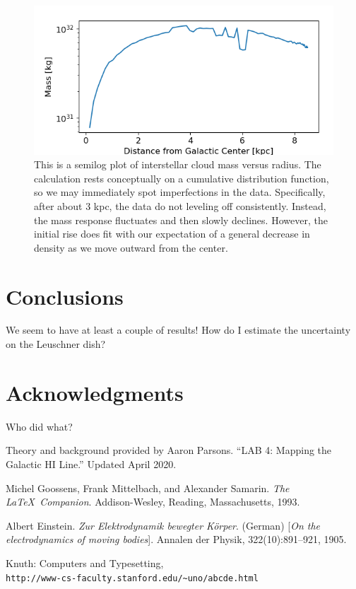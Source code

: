 \documentclass[12pt]{article}
\begin{document}
\begin{figure}
	\centering
	\includegraphics[width=.8\linewidth]{inner_mass_distro}
	\caption{This is a semilog plot of interstellar cloud mass versus radius. The calculation rests conceptually on a cumulative distribution function, so we may immediately spot imperfections in the data. Specifically, after about 3 kpc, the data do not leveling off consistently. Instead, the mass response fluctuates and then slowly declines. However, the initial rise does fit with our expectation of a general decrease in density as we move outward from the center.}
	\label{fig:inner_mass_distro}
\end{figure}

\section{Conclusions}

\quad \quad We seem to have at least a couple of results! How do I estimate the uncertainty on the Leuschner dish?

\section{Acknowledgments}

\quad \quad Who did what?

Theory and background provided by Aaron Parsons. ``LAB 4: Mapping the Galactic HI Line.'' Updated April 2020.



\begin{thebibliography}{9}
Michel Goossens, Frank Mittelbach, and Alexander Samarin. 
\textit{The \LaTeX\ Companion}. 
Addison-Wesley, Reading, Massachusetts, 1993.

Albert Einstein. 
\textit{Zur Elektrodynamik bewegter K{\"o}rper}. (German) 
[\textit{On the electrodynamics of moving bodies}]. 
Annalen der Physik, 322(10):891–921, 1905.

Knuth: Computers and Typesetting,
\\\texttt{http://www-cs-faculty.stanford.edu/\~{}uno/abcde.html}
\end{thebibliography}
\end{document}

